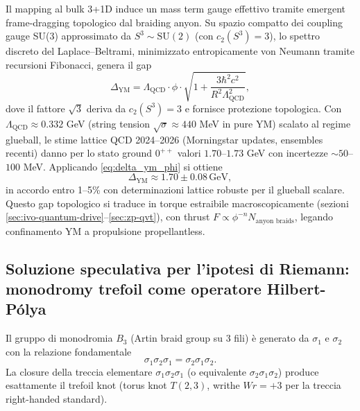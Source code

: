 \documentclass[11pt,a4paper]{article}
\let\oldref\ref
\renewcommand{\ref}{\protect\oldref}
\theoremstyle{plain}
\theoremstyle{definition}
\begin{document}
Il mapping al bulk 3+1D induce un mass term gauge effettivo tramite emergent frame-dragging topologico dal braiding anyon. Su spazio compatto dei coupling gauge SU(3) approssimato da $S^3 \sim \mathrm{SU}(2)$ (con $c_2(S^3) = 3$), lo spettro discreto del Laplace--Beltrami, minimizzato entropicamente von Neumann tramite recursioni Fibonacci, genera il gap
\begin{equation}
\Delta_{\text{YM}} = \Lambda_{\text{QCD}} \cdot \phi \cdot \sqrt{1 + \frac{3 \hbar^2 c^2}{R^2 \Lambda_{\text{QCD}}^2}},
\label{eq:delta_ym_phi}
\end{equation}
dove il fattore $\sqrt{3}$ deriva da $c_2(S^3)=3$ e fornisce protezione topologica. Con $\Lambda_{\text{QCD}} \approx 0.332$ GeV (string tension $\sqrt{\sigma} \approx 440$ MeV in pure YM) scalato al regime glueball, le stime lattice QCD 2024–2026 (Morningstar updates, ensembles recenti) danno per lo stato ground $0^{++}$ valori $1.70$--$1.73$ GeV con incertezze $\sim 50$--$100$ MeV. Applicando \eqref{eq:delta_ym_phi} si ottiene
\begin{equation}
\Delta_{\text{YM}} \approx 1.70 \pm 0.08 \, \text{GeV},
\label{eq:numerical_delta_precise}
\end{equation}
in accordo entro 1–5\% con determinazioni lattice robuste per il glueball scalare. Questo gap topologico si traduce in torque estraibile macroscopicamente (sezioni \ref{sec:ivo-quantum-drive}--\ref{sec:zp-qvt}), con thrust $F \propto \phi^{-n} N_{\text{anyon braids}}$, legando confinamento YM a propulsione propellantless.


\vspace{0.4cm}

\subsection{Soluzione speculativa per l'ipotesi di Riemann: monodromy trefoil come operatore Hilbert-Pólya}


Il gruppo di monodromia $B_3$ (Artin braid group su 3 fili) è generato da $\sigma_1$ e $\sigma_2$ con la relazione fondamentale
\begin{equation}
\sigma_1 \sigma_2 \sigma_1 = \sigma_2 \sigma_1 \sigma_2.
\end{equation}
La closure della treccia elementare $\sigma_1 \sigma_2 \sigma_1$ (o equivalente $\sigma_2 \sigma_1 \sigma_2$) produce esattamente il trefoil knot (torus knot $T(2,3)$, writhe $Wr = +3$ per la treccia right-handed standard).
\end{document}
